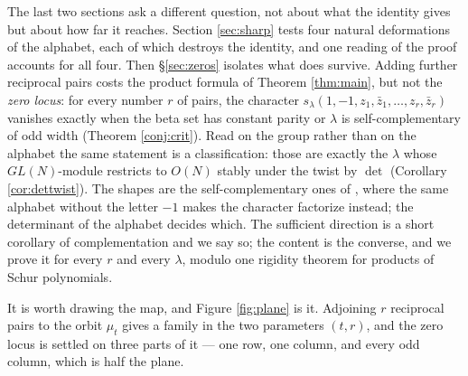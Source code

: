 \documentclass[11pt,reqno]{amsart}
\theoremstyle{plain}
\theoremstyle{definition}
\newcommand{\zt}{\mu_t}
\begin{document}
The last two sections ask a different question, not about what the identity gives but about how far
it reaches. Section \ref{sec:sharp} tests four natural deformations of the alphabet, each of which
destroys the identity, and one reading of the proof accounts for all four. Then
\S\ref{sec:zeros} isolates what does survive. Adding further reciprocal pairs
costs the product formula of Theorem \ref{thm:main}, but not the \emph{zero locus}: for every number
$r$ of pairs, the character
$s_\lambda(1,-1,z_1,\bar z_1,\dots,z_r,\bar z_r)$ vanishes exactly when the beta set has constant
parity or $\lambda$ is self-complementary of odd width (Theorem \ref{conj:crit}). Read on the group
rather than on the alphabet the same statement is a classification: those are exactly the $\lambda$
whose $GL(N)$-module restricts to $O(N)$ stably under the twist by $\det$ (Corollary
\ref{cor:dettwist}). The shapes are the
self-complementary ones of \cite{AB19}, where the same alphabet without the letter $-1$ makes the
character factorize instead; the determinant of the alphabet decides which. The sufficient direction
is a short corollary of complementation and we say so; the content is the converse, and we prove it
for every $r$ and every $\lambda$, modulo one rigidity theorem for products of Schur polynomials.

It is worth drawing the map, and Figure \ref{fig:plane} is it. Adjoining $r$ reciprocal pairs to the
orbit $\zt$ gives a family in the two parameters $(t,r)$, and the zero locus is settled on three
parts of it --- one row, one column, and every odd column, which is half the plane.
\end{document}
